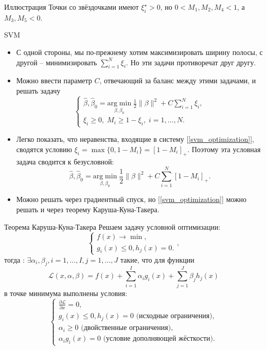 \documentclass[9pt]{beamer}
\begin{document}
\begin{frame}{Иллюстрация}
    Точки со звёздочками имеют $\xi^\star_i > 0$, но $0 < M_1, M_2, M_4 < 1$, а $M_3, M_5 < 0$.
\end{frame}

\begin{frame}{SVM}
    \begin{itemize}
        \item С одной стороны, мы по-прежнему хотим максимизировать ширину полосы, с другой -- минимизировать $\sum_{i=1}^N \xi_i$. Но эти задачи противоречат друг другу.
        \item Можно ввести параметр $C$, отвечающий за баланс между этими задачами, и решать задачу
        \begin{equation}\label{svm_optimization}
        \begin{cases}
            \hat\beta, \hat\beta_0 = \underset{\beta,\beta_0}{\mathrm{arg\;min}}\; \frac{1}{2}\|\beta\|^2 + C\sum_{i=1}^N\xi_i,\\
            \xi_i \geq 0, \; M_i \geq 1 - \xi_i,\; i=1,\ldots,N.
        \end{cases}
        \end{equation}
        \item Легко показать, что неравенства, входящие в систему [\ref{svm_optimization}], сводятся условию $\xi_i = \max\{0, 1 - M_i\} = [1 - M_i]_+$. Поэтому эта условная задача сводится к безусловной:
        $$\hat\beta, \hat\beta_0 = \underset{\beta,\beta_0}{\mathrm{arg\;min}}\; \frac{1}{2}\|\beta\|^2 + C\sum_{i=1}^N [1 - M_i]_+.$$
        \item Можно решать через градиентный спуск, но [\ref{svm_optimization}] можно решать и через теорему Каруша-Куна-Такера.
    \end{itemize}
\end{frame}

\begin{frame}{Теорема Каруша-Куна-Такера}
    Решаем задачу условной оптимизации:
    $$\begin{cases}
        f(x)\rightarrow \min,\\
        g_i(x) \leq 0,
        h_j(x) = 0.
    \end{cases},$$
    тогда : $\exists \alpha_i, \beta_j, i=1,\ldots,I, j=1,\ldots,J$ такие, что для функции $$\mathcal{L}(x, \alpha,\beta) = f(x) + \sum_{i=1}^I\alpha_ig_i(x) + \sum_{j=1}^J\beta_jh_j(x)$$ в точке минимума выполнены условия:
    $$\begin{cases}
        \frac{\partial\mathcal{L}}{\partial x}=0,\\
        g_i(x) \leq 0, h_j(x) = 0 \text{ (исходные ограничения)},\\
        \alpha_i \geq 0 \text{ (двойственные ограничения)},\\
        \alpha_ig_i(x) = 0 \text{ (условие дополняющей жёсткости)}.
    \end{cases}$$
\end{frame}
\end{document}

